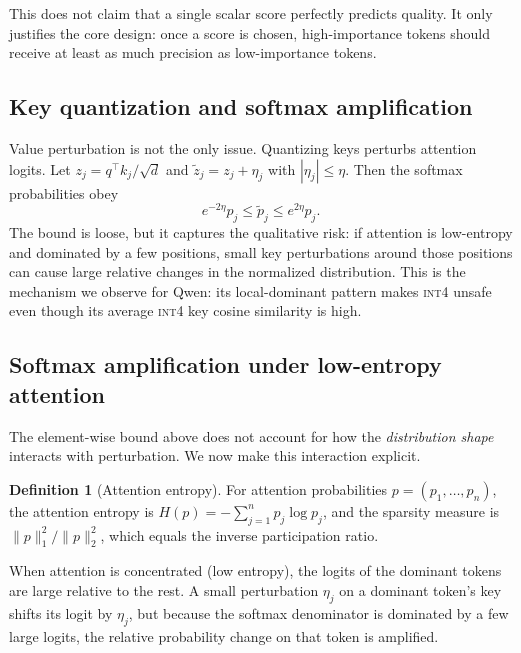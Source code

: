 \documentclass[11pt]{article}
\newcommand{\intiv}{\textsc{int4}}
\theoremstyle{plain}
\theoremstyle{definition}
\newtheorem{definition}{Definition}
\begin{document}
This does not claim that a single scalar score perfectly predicts quality.  It only justifies the core design: once a score is chosen, high-importance tokens should receive at least as much precision as low-importance tokens.

\subsection{Key quantization and softmax amplification}
Value perturbation is not the only issue.  Quantizing keys perturbs attention logits.  Let $z_j=q^\top k_j/\sqrt{d}$ and $\tilde z_j=z_j+\eta_j$ with $|\eta_j|\le \eta$.  Then the softmax probabilities obey
\begin{equation}
  e^{-2\eta}p_j \le \tilde p_j \le e^{2\eta}p_j .
\end{equation}
The bound is loose, but it captures the qualitative risk: if attention is low-entropy and dominated by a few positions, small key perturbations around those positions can cause large relative changes in the normalized distribution.  This is the mechanism we observe for Qwen: its local-dominant pattern makes \intiv{} unsafe even though its average \intiv{} key cosine similarity is high.

\subsection{Softmax amplification under low-entropy attention}
\label{sec:softmax-amp}

The element-wise bound above does not account for how the \emph{distribution shape} interacts with perturbation.  We now make this interaction explicit.

\begin{definition}[Attention entropy]
For attention probabilities $p=(p_1,\ldots,p_n)$, the attention entropy is $H(p)=-\sum_{j=1}^n p_j\log p_j$, and the sparsity measure is $\|p\|_1^2/\|p\|_2^2$, which equals the inverse participation ratio.
\end{definition}

When attention is concentrated (low entropy), the logits of the dominant tokens are large relative to the rest.  A small perturbation $\eta_j$ on a dominant token's key shifts its logit by $\eta_j$, but because the softmax denominator is dominated by a few large logits, the relative probability change on that token is amplified.
\end{document}
